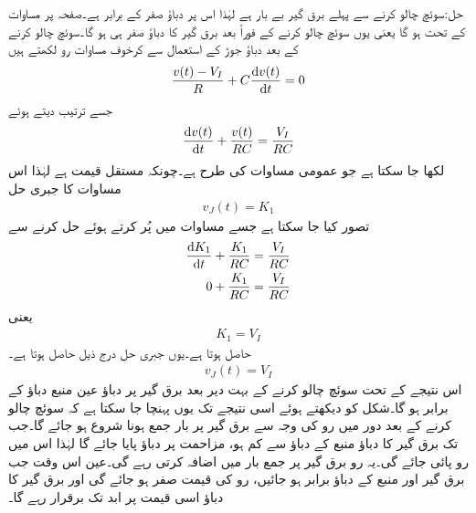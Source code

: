 حل:سوئچ چالو کرنے سے پہلے برق گیر بے بار ہے لہٰذا اس پر دباؤ صفر کے برابر ہے۔صفحہ  پر مساوات  کے تحت  ہو گا یعنی یوں سوئچ چالو کرنے کے فوراً بعد برق گیر کا دباؤ صفر ہی ہو گا۔سوئچ چالو کرنے کے بعد  دباؤ جوڑ  کے استعمال سے کرخوف مساوات رو لکھتے ہیں
\begin{align*}
\frac{v(t)-V_I}{R}+C\frac{\dif v(t)}{\dif t}=0
\end{align*}
جسے ترتیب دیتے ہوئے
\begin{align}\label{مساوات_عارضی_برق_گیر_عارضی_حل_الف}
\frac{\dif v(t)}{\dif t}+\frac{v(t)}{RC}=\frac{V_I}{RC}
\end{align}
لکھا  جا سکتا ہے جو عمومی مساوات  کی طرح ہے۔چونکہ  مستقل قیمت ہے لہٰذا اس مساوات کا جبری حل
\begin{align*}
v_J(t)=K_1
\end{align*}
 تصور کیا جا سکتا ہے جسے  مساوات  میں پُر کرتے ہوئے حل کرنے سے
\begin{align*}
\frac{\dif  K_1}{\dif t}+\frac{K_1}{RC}&=\frac{V_I}{RC}\\
0+\frac{K_1}{RC}&=\frac{V_I}{RC}
\end{align*}
یعنی
\begin{align*}
K_1=V_I
\end{align*}
حاصل ہوتا ہے۔یوں جبری حل درج ذیل حاصل ہوتا ہے۔
\begin{align*}
v_J(t)=V_I
\end{align*}
اس نتیجے کے تحت سوئچ چالو کرنے کے بہت دیر بعد برق گیر پر دباؤ عین منبع دباؤ کے برابر ہو گا۔شکل کو دیکھتے ہوئے اسی نتیجے تک یوں پہنچا جا سکتا ہے کہ سوئچ چالو کرنے کے بعد دور میں رو کی وجہ سے برق گیر پر بار جمع ہونا شروع ہو جائے گا۔جب تک برق گیر کا دباؤ منبع کے دباؤ سے کم ہو، مزاحمت پر دباؤ پایا جائے گا لہٰذا اس میں رو پائی جائے گی۔یہ رو برق گیر پر جمع بار میں اضافہ کرتی رہے گی۔عین اس وقت جب برق گیر اور منبع کے دباؤ برابر ہو جائیں، رو کی قیمت صفر ہو جائے گی اور برق گیر کا دباؤ اسی قیمت پر ابد تک برقرار رہے گا۔ 

